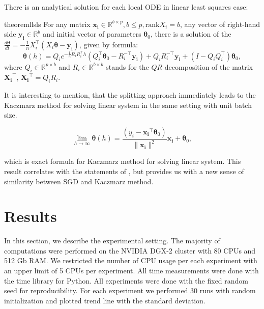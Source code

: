 \documentclass{article}
\newcommand{\vect}[1]{\boldsymbol{\mathbf{#1}}}
\begin{document}
There is an analytical solution for each local ODE in linear least squares case:

\begin{restatable}{theorem}{llsls}\label{strang:LLS_local_solution} For any matrix $\vect{x_i} \in \mathbb{R}^{b \times p}, b \leq p, \text{rank}X_i = b$, any vector of right-hand side $\vect{y_i} \in \mathbb{R}^{b}$ and initial vector of parameters $\vect{\theta}_0$, there is a solution of the $\frac{d \vect{\theta}}{d t} = - \frac{1}{n} X_i^\top( X_i \vect{\theta} - \vect{y_i})$, given by formula:
\begin{equation}\label{strang:LLS_local_solution_formula}
\vect{\theta}(h) = Q_i e^{-\frac{1}{n}R_iR_i^\top h} \left( Q_i^\top \vect{\theta}_0 - R_i^{-\top}\vect{y_i}\right) + Q_iR_i^{-\top}\vect{y_i} + (I - Q_iQ_i^\top)\vect{\theta}_0,
\end{equation}
where $Q_i \in \mathbb{R}^{p \times b}$ and $R_i \in \mathbb{R}^{b \times b}$ stands for the $QR$ decomposition of the matrix $\vect{X_i}^\top$, $\vect{X_i}^\top = Q_i R_i$.
\end{restatable}

It is interesting to mention, that the splitting approach immediately leads to the Kaczmarz \citet{kaczmarz1937method, strohmer2009randomized, gower2015randomized} method for solving linear system in the same setting with unit batch size.

\begin{equation}
\label{strang:splitting_limit_kaczmarz}
\lim_{h \to \infty} \vect{\theta}(h) = \frac{\left(y_i - \vect{x_i}^\top\vect{\theta}_0 \right)}{\|\vect{x_i}\|^2} \vect{x_i} + \vect{\theta}_0,
\end{equation}

which is exact formula for Kaczmarz method for solving linear system. This result correlates with the statements of \citet{needell2014stochastic}, but provides us with a new sense of similarity between SGD and Kaczmarz method.


\section{Results}

In this section, we describe the experimental setting. The majority of computations were performed on the NVIDIA DGX-2 cluster with 80 CPUs and 512 Gb RAM. We restricted the number of CPU usage per each experiment with an upper limit of 5 CPUs per experiment. All time measurements were done with the time library for Python. All experiments were done with the fixed random seed for reproducibility. For each experiment we performed 30 runs with random initialization and plotted trend line with the standard deviation.
\end{document}

